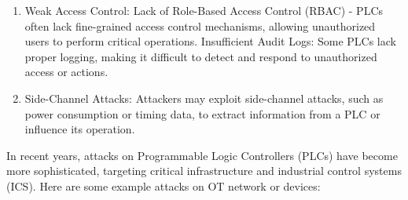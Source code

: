 \begin{enumerate}
    \item Weak Access Control: Lack of Role-Based Access Control (RBAC) -  PLCs often lack fine-grained access control mechanisms, allowing unauthorized users to perform critical operations. Insufficient Audit Logs: Some PLCs lack proper logging, making it difficult to detect and respond to unauthorized access or actions.

   \item Side-Channel Attacks: Attackers may exploit side-channel attacks, such as power consumption or timing data, to extract information from a PLC or influence its operation.



\end{enumerate}


In recent years, attacks on Programmable Logic Controllers (PLCs) have become more sophisticated, targeting critical infrastructure and industrial control systems (ICS). Here are some example attacks on OT network or devices:
